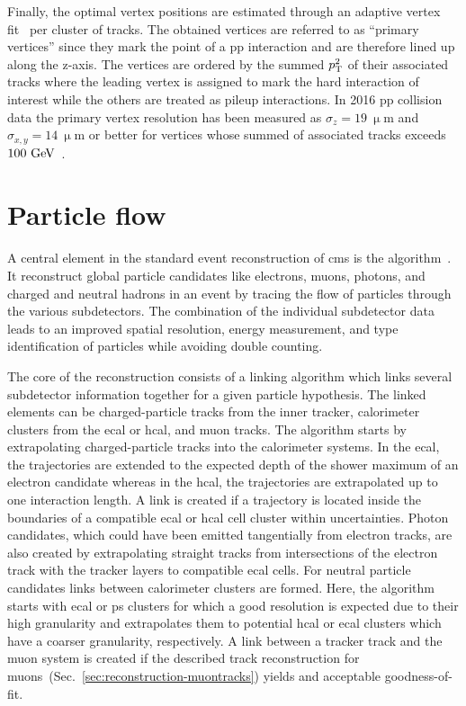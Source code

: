 Finally, the optimal vertex positions are estimated through an adaptive vertex fit~\cite{0954-3899-34-12-N01} per cluster of tracks. The obtained vertices are referred to as ``primary vertices'' since they mark the point of a \gls{pp} interaction and are therefore lined up along the z-axis. The vertices are ordered by the summed $p_\textrm{T}^2$ of their associated tracks where the leading vertex is assigned to mark the hard interaction of interest while the others are treated as pileup interactions. In 2016 \gls{pp} collision data the primary vertex resolution has been measured as $\sigma_{z}=19~\upmu\mathrm{m}$ and $\sigma_{x,y}=14~\upmu\mathrm{m}$ or better for vertices whose summed \pt of associated tracks exceeds $100~\textrm{GeV}$~\cite{CMS-DP-2016-041}.



\section{Particle flow}

A central element in the standard event reconstruction of \gls{cms} is the  algorithm~\cite{CMS:2009nxa}. It reconstruct global particle candidates like electrons, muons, photons, and charged and neutral hadrons in an event by tracing the flow of particles through the various subdetectors. The combination of the individual subdetector data leads to an improved spatial resolution, energy measurement, and type identification of particles while avoiding double counting.

The core of the  reconstruction consists of a linking algorithm which links several subdetector information together for a given particle hypothesis. The linked elements can be charged-particle tracks from the inner tracker, calorimeter clusters from the \gls{ecal} or \gls{hcal}, and muon tracks. The algorithm starts by extrapolating charged-particle tracks into the calorimeter systems. In the \gls{ecal}, the trajectories are extended to the expected depth of the shower maximum of an electron candidate whereas in the \gls{hcal}, the trajectories are extrapolated up to one interaction length. A link is created if a trajectory is located inside the boundaries of a compatible \gls{ecal} or \gls{hcal} cell cluster within uncertainties. Photon candidates, which could have been emitted tangentially from electron tracks, are also created by extrapolating straight tracks from intersections of the electron track with the tracker layers to compatible \gls{ecal} cells. For neutral particle candidates links between calorimeter clusters are formed. Here, the algorithm starts with \gls{ecal} or \gls{ps} clusters for which a good resolution is expected due to their high granularity and extrapolates them to potential \gls{hcal} or \gls{ecal} clusters which have a coarser granularity, respectively. A link between a tracker track and the muon system is created if the described track reconstruction for muons~(Sec.~\ref{sec:reconstruction-muontracks}) yields and acceptable goodness-of-fit.


